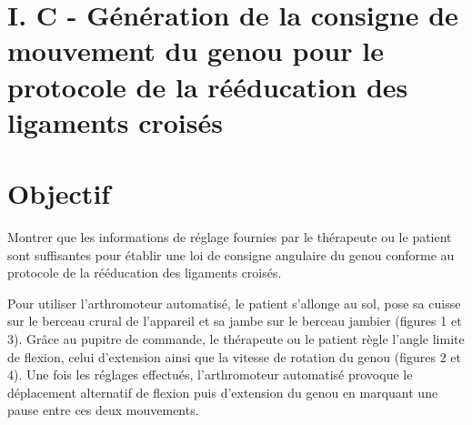 \section*{I. C - Génération de la consigne de mouvement du genou pour le protocole de la rééducation des ligaments croisés}
\section*{Objectif}
Montrer que les informations de réglage fournies par le thérapeute ou le patient sont suffisantes pour établir une loi de consigne angulaire du genou conforme au protocole de la rééducation des ligaments croisés.

Pour utiliser l'arthromoteur automatisé, le patient s'allonge au sol, pose sa cuisse sur le berceau crural de l'appareil et sa jambe sur le berceau jambier (figures 1 et 3). Grâce au pupitre de commande, le thérapeute ou le patient règle l'angle limite de flexion, celui d'extension ainsi que la vitesse de rotation du genou (figures 2 et 4). Une fois les réglages effectués, l'arthromoteur automatisé provoque le déplacement alternatif de flexion puis d'extension du genou en marquant une pause entre ces deux mouvements.

